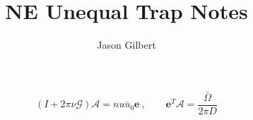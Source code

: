 \documentclass[10pt,a4paper]{article}
\author{Jason Gilbert}
\title{NE Unequal Trap Notes}
\newcommand{\subDom}{\bar{\Omega}}
\newcommand{\amfpt}{\overline{u}_0} %
\newcommand{\greenMat}{\mathcal{G}} %
\newcommand{\vecA}{\mathcal{A}}     %
\newcommand{\vecE}{\textbf{e}}      %
\begin{document}
\begin{equation}
(I + 2\pi\nu\greenMat)\vecA = nu\amfpt\vecE \ , \qquad
\vecE^T \vecA = \dfrac{\subDom}{2\pi D}
\end{equation}
\end{document}
